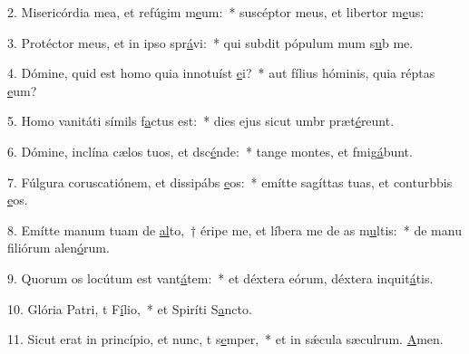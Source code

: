 2. Misericórdia mea, et refúgim m\uline{e}um:~* suscéptor meus, et libertor m\uline{e}us:\par 
3. Protéctor meus, et in ipso spr\uline{á}vi:~* qui subdit pópulum mum s\uline{u}b me.\par 
4. Dómine, quid est homo quia innotuíst \uline{e}i?~* aut fílius hóminis, quia réptas \uline{e}um?\par 
5. Homo vanitáti símils f\uline{a}ctus est:~* dies ejus sicut umbr præt\uline{é}reunt.\par 
6. Dómine, inclína cælos tuos, et dsc\uline{é}nde:~* tange montes, et fmig\uline{á}bunt.\par 
7. Fúlgura coruscatiónem, et dissipábs \uline{e}os:~* emítte sagíttas tuas, et conturbbis \uline{e}os.\par 
8. Emítte manum tuam de \uline{al}to,~† éripe me, et líbera me de as m\uline{u}ltis:~* de manu filiórum alen\uline{ó}rum.\par 
9. Quorum os locútum est vant\uline{á}tem:~* et déxtera eórum, déxtera inquit\uline{á}tis.\par 
10. Glória Patri, t F\uline{í}lio,~* et Spiríti S\uline{a}ncto.\par 
11. Sicut erat in princípio, et nunc, t s\uline{e}mper,~* et in sǽcula sæculrum. \uline{A}men.\par 
